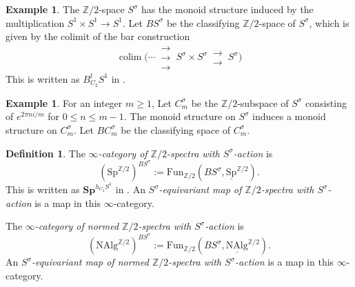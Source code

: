 \documentclass[10pt]{amsart}
\theoremstyle{definition}
\newtheorem{df}[thm]{Definition}
\newtheorem{exm}[thm]{Example}
\numberwithin{equation}{section}
\newcommand{\Z}{\mathbb{Z}}
\newcommand{\ul}{\underline}
\newcommand{\Fun}{\mathrm{Fun}}
\newcommand{\NAlg}{\mathrm{NAlg}}
\newcommand{\Sp}{\mathrm{Sp}}
\newcommand{\colim}{\mathop{\mathrm{colim}}}
\begin{document}
\begin{exm}
The $\Z/2$-space $S^\sigma$ has the monoid structure induced by the multiplication $S^1\times S^1\to S^1$.
Let $B S^\sigma$ be the classifying $\Z/2$-space of $S^\sigma$,
which is given by the colimit of the bar construction
\[
\colim
\big(
\cdots
\,
\substack{\rightarrow\\[-1em] \rightarrow \\[-1em] \rightarrow}
\,
S^\sigma \times S^\sigma
\,
\substack{\rightarrow\\[-1em] \rightarrow}
\,
S^\sigma
\big)
\]
This is written as $B_{C_2}^tS^1$ in \cite{QS22}.
\end{exm}

\begin{exm}
For an integer $m\geq 1$,
Let $C_m^\sigma$ be the $\Z/2$-subspace of $S^\sigma$ consisting of $e^{2\pi n i/m}$ for $0\leq n\leq m-1$.
The monoid structure on $S^\sigma$ induces a monoid structure on $C_m^\sigma$.
Let $B C_m^\sigma$ be the classifying space of $C_m^\sigma$.
\end{exm}





\begin{df}
The \emph{$\infty$-category of $\Z/2$-spectra with $S^\sigma$-action} is 
\[
(\Sp^{\Z/2})^{B S^\sigma}
:=
\Fun_{\Z/2}(B S^\sigma,\ul{\Sp}^{\Z/2}).
\]
This is written as $\mathbf{Sp}^{h_{C_2}S^1}$ in \cite{QS22}.
An \emph{$S^\sigma$-equivariant map of $\Z/2$-spectra with $S^\sigma$-action} is a map in this $\infty$-category.


The \emph{$\infty$-category of normed $\Z/2$-spectra with $S^\sigma$-action} is
\[
(\NAlg^{\Z/2})^{B S^\sigma}
:=
\Fun_{\Z/2}(BS^\sigma,\ul{\NAlg}^{\Z/2}).
\]
An \emph{$S^\sigma$-equivariant map of normed $\Z/2$-spectra with $S^\sigma$-action} is a map in this $\infty$-category.
\end{df}
\end{document}
